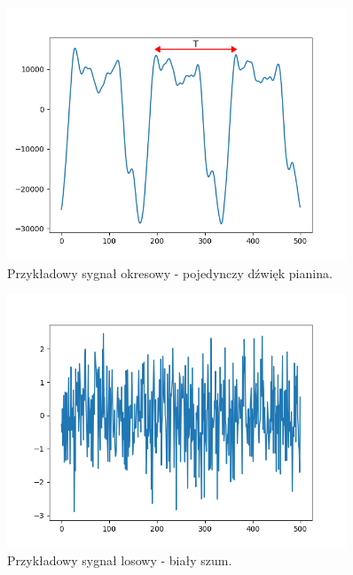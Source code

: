 \begin{figure}[htb]
    \centering
    \includegraphics[width=0.9\textwidth]{images/sygnal_okresowy}
    \caption{Przykładowy sygnał okresowy - pojedynczy dźwięk pianina.}
    \label{fig:sygnal_okresowy}
\end{figure}

\begin{figure}[htb]
    \centering
    \includegraphics[width=0.9\textwidth]{images/sygnal_losowy}
    \caption{Przykładowy sygnał losowy - biały szum.}
    \label{fig:sygnal_losowy}
\end{figure}

